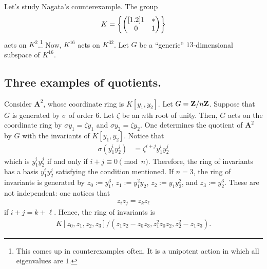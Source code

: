 \documentclass [11 pt, oneside] {article}
\begin{document}
Let's study Nagata's counterexample. The group
\begin{align*}
	K = \left\{ \begin{pmatrix} [1.2] 1&*\\0&1\end{pmatrix} \right\} 
\end{align*}
acts on $K^2$.\footnote{This comes up in counterexamples often. It is a unipotent action in which all eigenvalues are $1$.} Now, $K^{16}$ acts on $K^{32}$. Let $G$ be a ``generic'' $13$-dimensional subspace of $K^{16}$. 


\subsection{Three examples of quotients.}

\begin{example}\label{}
Consider $\mathbf{A}^2$, whose coordinate ring is $K[y_1,y_2]$. Let $G=\mathbf Z / n\mathbf Z$. Suppose that $G$ is generated by $\sigma$ of order $6$. Let $\zeta$ be an $n$th root of unity. Then, $G$ acts on the coordinate ring by $\sigma y_1 = \zeta y_1$ and $\sigma y_2= \zeta y_2$. One determines the quotient of $\mathbf{A}^2$ by $G$ with the invariants of $K[y_1,y_2]$. Notice that 
\begin{align*}
	\sigma(y_1^iy_2^j) &= \zeta^{i+j} y_1^iy_2^j
\end{align*}
which is $y_1^iy_2^j$ if and only if $i+j\equiv 0\pmod n$. Therefore, the ring of invariants has a basis $y_1^iy_2^j$ satisfying the condition mentioned. If $n=3$, the ring of invariants is generated by $z_0:=y_1^3$, $z_1:=y_1^2y_2$, $z_2:=y_1y_2^2$, and $z_3:=y_2^3$. These are not independent: one notices that
\begin{align*}
	z_iz_j = z_kz_\ell
\end{align*}
if $i+j=k+\ell$. Hence, the ring of invariants is
\begin{align*}
	K[z_0,z_1,z_2,z_3] / (z_1z_2-z_0z_3, z_1^2 z_0z_2, z_2^2-z_1z_3). 
\end{align*}
\end{example}
\end{document}
